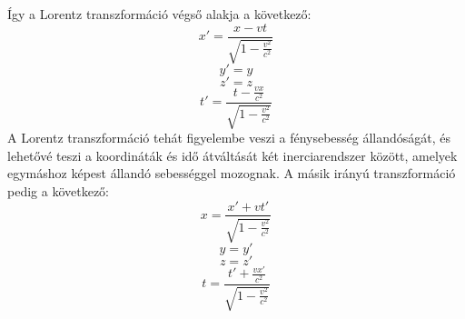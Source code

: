 \documentclass[a4paper,12pt]{article}
\begin{document}
Így a Lorentz transzformáció végső alakja a következő:
\begin{equation}
    x' = \frac{x - vt}{\sqrt{1 - \frac{v^2}{c^2}}}
\end{equation}
\begin{equation}
    y' = y
\end{equation}
\begin{equation}
    z' = z
\end{equation}
\begin{equation}
    t' = \frac{t - \frac{vx}{c^2}}{\sqrt{1 - \frac{v^2}{c^2}}}
\end{equation}
A Lorentz transzformáció tehát figyelembe veszi a fénysebesség állandóságát, és lehetővé teszi a koordináták és idő átváltását két inerciarendszer között, amelyek egymáshoz képest állandó sebességgel mozognak.
A másik irányú transzformáció pedig a következő:
\begin{equation}
    x = \frac{x' + vt'}{\sqrt{1 - \frac{v^2}{c^2}}}
\end{equation}
\begin{equation}
    y = y'
\end{equation}
\begin{equation}
    z = z'
\end{equation}
\begin{equation}
    t = \frac{t' + \frac{vx'}{c^2}}{\sqrt{1 - \frac{v^2}{c^2}}}
\end{equation}
\end{document}
